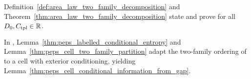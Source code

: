 \begin{remark}
    \label{rem:peps_companion_two_families}
    Definition~\ref{def:area_law_two_family_decomposition} and
    Theorem~\ref{thm:area_law_two_family_decomposition} state and prove
    \cite[Proposition~11.2]{OpenAI2026AreaLaw} for all $D_0,C_{\rm tpl}\in\mathbb R$.
\end{remark}

\begin{remark}
    \label{rem:peps_companion_cell}
    In \cite[Lemma~3.2]{OpenAI2026PolynomialPEPS},
    Lemma~\ref{thm:peps_labelled_conditional_entropy} and
    Lemma~\ref{thm:peps_cell_two_family_partition} adapt the two-family
    ordering of \cite[Lemma~11.1]{OpenAI2026AreaLaw} to a cell with exterior
    conditioning, yielding Lemma~\ref{thm:peps_cell_conditional_information_from_gap}.
\end{remark}

